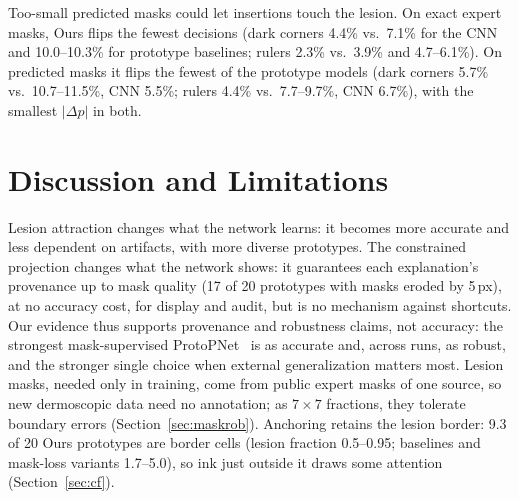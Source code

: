 \documentclass[conference]{IEEEtran}
\begin{document}
Too-small predicted masks could let insertions touch the lesion. On exact expert masks, Ours flips the fewest decisions (dark corners 4.4\% vs.\ 7.1\% for the CNN and 10.0--10.3\% for prototype baselines; rulers 2.3\% vs.\ 3.9\% and 4.7--6.1\%). On predicted masks it flips the fewest of the prototype models (dark corners 5.7\% vs.\ 10.7--11.5\%, CNN 5.5\%; rulers 4.4\% vs.\ 7.7--9.7\%, CNN 6.7\%), with the smallest $|\Delta p|$ in both.

\section{Discussion and Limitations}
Lesion attraction changes what the network learns: it becomes more accurate and less dependent on artifacts, with more diverse prototypes. The constrained projection changes what the network shows: it guarantees each explanation's provenance up to mask quality (17 of 20 prototypes with masks eroded by 5\,px), at no accuracy cost, for display and audit, but is no mechanism against shortcuts. Our evidence thus supports provenance and robustness claims, not accuracy: the strongest mask-supervised ProtoPNet~\cite{correia2023} is as accurate and, across runs, as robust, and the stronger single choice when external generalization matters most. Lesion masks, needed only in training, come from public expert masks of one source, so new dermoscopic data need no annotation; as $7\times7$ fractions, they tolerate boundary errors (Section~\ref{sec:maskrob}). Anchoring retains the lesion border: 9.3 of 20 Ours prototypes are border cells (lesion fraction 0.5--0.95; baselines and mask-loss variants 1.7--5.0), so ink just outside it draws some attention (Section~\ref{sec:cf}).
\end{document}
